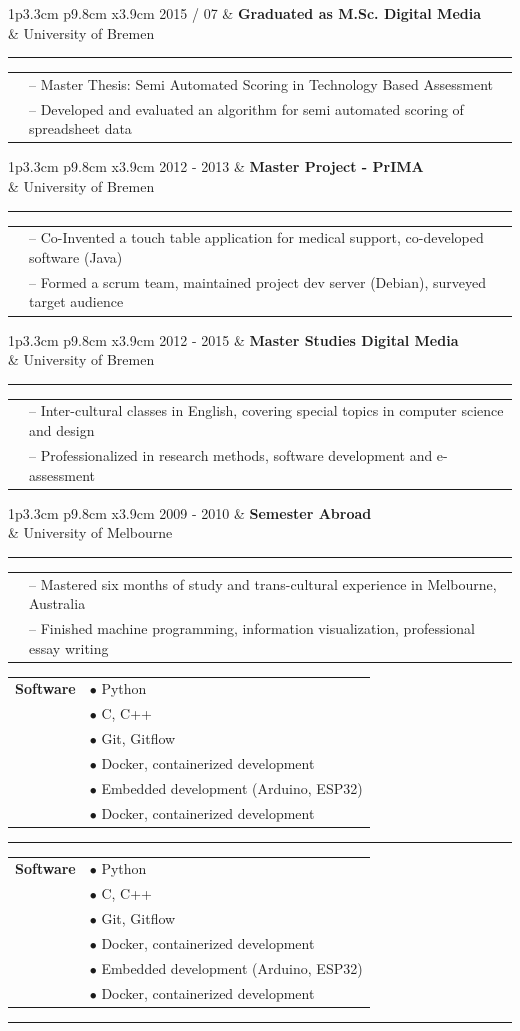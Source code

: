 \documentclass[10pt,A4]{article}
\newcommand{\cvsection}[1]{
	\colorbox{sectcol}{
	\mystrut \makebox[1\linewidth][l]{
		\textcolor{white}{\textbf{#1}}\hspace{4pt}
		}
		}
}
\newcommand{\cvevent}[5]
{
\vspace{8pt}

\begin{tabular*}{1\textwidth}{p{3.3cm}  p{9.8cm} x{3.9cm}}
	\textcolor{bgcol}{#1} 	& \textbf{#2} \\ 
	 						& \textcolor{sectcol}{#3} \\
\end{tabular*}

\textcolor{softcol}{\hrule}

\vspace{6pt}
\begin{tabular*}{1\textwidth}{p{3.3cm} p{13.4cm}}
	&	\textcolor{bgcol}{--}  #4\\[3pt]
	&	\textcolor{bgcol}{--}  #5\\[6pt]
\end{tabular*}
}
\newcommand{\cvskill}[7]
{
\vspace{8pt}
\begin{tabular*}{1\textwidth}{p{3.3cm} p{13.4cm}}
	\textbf{#1} 		&	\textcolor{bgcol}{$\bullet$ }  #2\\[3pt]
						&	\textcolor{bgcol}{$\bullet$ }  #3\\[3pt]
						&	\textcolor{bgcol}{$\bullet$ }  #4\\[3pt]
						&	\textcolor{bgcol}{$\bullet$ }  #5\\[6pt]
						&	\textcolor{bgcol}{$\bullet$ }  #6\\[6pt]
						&	\textcolor{bgcol}{$\bullet$ }  #7\\[6pt]
\end{tabular*}
\textcolor{softcol}{\hrule}
}
\newcommand{\mystrut}{\rule[-.3\baselineskip]{0pt}{\baselineskip}}
\begin{document}
\cvevent{2015 / 07}{Graduated as M.Sc. Digital Media}{University of Bremen}
{Master Thesis: Semi Automated Scoring in Technology Based Assessment}
{Developed and evaluated an algorithm for semi automated scoring of spreadsheet data}

\cvevent{2012 - 2013}{Master Project - PrIMA}{University of Bremen}
{Co-Invented a touch table application for medical support, co-developed software (Java) }
{Formed a scrum team, maintained project dev server (Debian), surveyed target audience}

\cvevent{2012 - 2015}{Master Studies Digital Media}{University of Bremen}
{Inter-cultural classes in English, covering special topics in computer science and design}
{Professionalized in research methods, software development and e-assessment}

\cvevent{2009 - 2010}{Semester Abroad}{University of Melbourne}
{Mastered six months of study and trans-cultural experience in Melbourne, Australia}
{Finished machine programming, information visualization, professional essay writing}

\cvsection{Skills}

\cvskill{Software}
{Python}
{C, C++}
{Git, Gitflow}
{Docker, containerized development}
{Embedded development (Arduino, ESP32)}
{Docker, containerized development}

\cvskill{Software}
{Python}
{C, C++}
{Git, Gitflow}
{Docker, containerized development}
{Embedded development (Arduino, ESP32)}
{Docker, containerized development}


\null
\vspace*{\fill}

\end{document}

